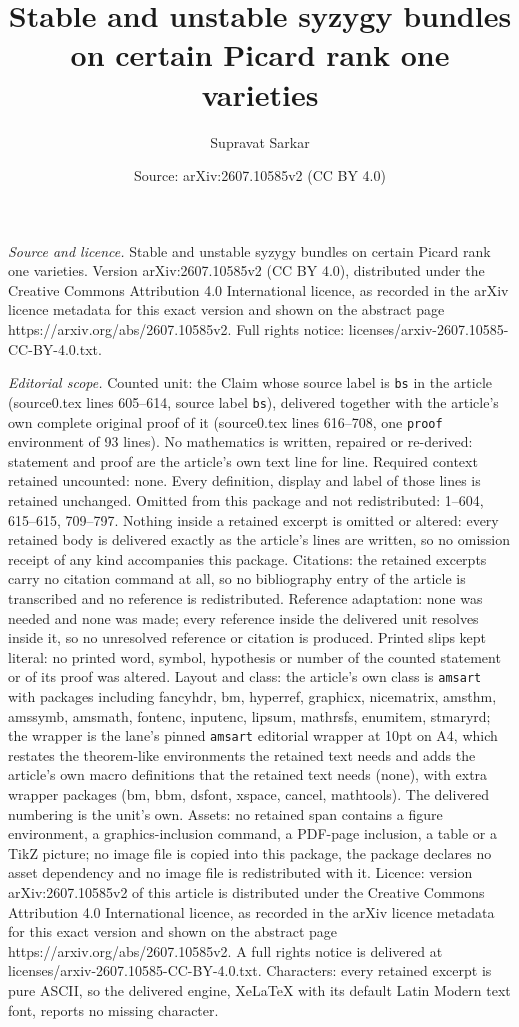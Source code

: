 \documentclass[10pt,a4paper]{amsart}
\title[Stable and unstable syzygy bundles on certain Picard rank on]{Stable and unstable syzygy bundles on certain Picard rank one varieties}
\author{Supravat Sarkar}
\date{Source: arXiv:2607.10585v2 (CC BY 4.0)}
\begin{document}
\maketitle

\noindent\emph{Source and licence.} Stable and unstable syzygy bundles on certain Picard rank one varieties. Version arXiv:2607.10585v2 (CC BY 4.0), distributed under the Creative Commons Attribution 4.0 International licence, as recorded in the arXiv licence metadata for this exact version and shown on the abstract page https://arxiv.org/abs/2607.10585v2. Full rights notice: licenses/arxiv-2607.10585-CC-BY-4.0.txt.\par\smallskip

\noindent\textit{Editorial scope.} Counted unit: the Claim whose source label is \texttt{bs} in the article (source0.tex lines 605--614, source label \texttt{bs}), delivered together with the article's own complete original proof of it (source0.tex lines 616--708, one \texttt{proof} environment of 93 lines). No mathematics is written, repaired or re-derived: statement and proof are the article's own text line for line. Required context retained uncounted: none. Every definition, display and label of those lines is retained unchanged. Omitted from this package and not redistributed: 1--604, 615--615, 709--797. Nothing inside a retained excerpt is omitted or altered: every retained body is delivered exactly as the article's lines are written, so no omission receipt of any kind accompanies this package. Citations: the retained excerpts carry no citation command at all, so no bibliography entry of the article is transcribed and no reference is redistributed. Reference adaptation: none was needed and none was made; every reference inside the delivered unit resolves inside it, so no unresolved reference or citation is produced. Printed slips kept literal: no printed word, symbol, hypothesis or number of the counted statement or of its proof was altered. Layout and class: the article's own class is \texttt{amsart} with packages including fancyhdr, bm, hyperref, graphicx, nicematrix, amsthm, amssymb, amsmath, fontenc, inputenc, lipsum, mathrsfs, enumitem, stmaryrd; the wrapper is the lane's pinned \texttt{amsart} editorial wrapper at 10pt on A4, which restates the theorem-like environments the retained text needs and adds the article's own macro definitions that the retained text needs (none), with extra wrapper packages (bm, bbm, dsfont, xspace, cancel, mathtools). The delivered numbering is the unit's own. Assets: no retained span contains a figure environment, a graphics-inclusion command, a PDF-page inclusion, a table or a TikZ picture; no image file is copied into this package, the package declares no asset dependency and no image file is redistributed with it. Licence: version arXiv:2607.10585v2 of this article is distributed under the Creative Commons Attribution 4.0 International licence, as recorded in the arXiv licence metadata for this exact version and shown on the abstract page https://arxiv.org/abs/2607.10585v2. A full rights notice is delivered at licenses/arxiv-2607.10585-CC-BY-4.0.txt. Characters: every retained excerpt is pure ASCII, so the delivered engine, XeLaTeX with its default Latin Modern text font, reports no missing character.
\end{document}

